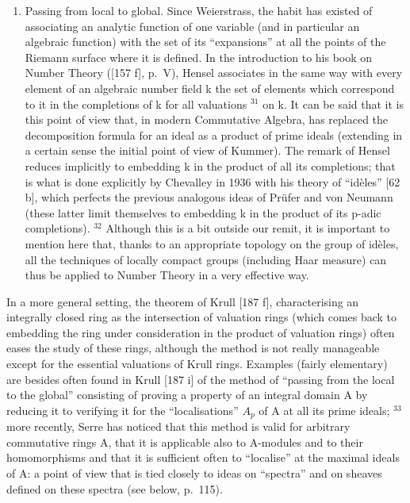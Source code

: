 \begin{enumerate}
\def\labelenumi{\Alph{enumi})}
\setcounter{enumi}{1}
\tightlist
\item
  Passing from local to global. Since Weierstrass, the habit has existed of associating an analytic function of one variable (and in particular an algebraic function) with the set of its ``expansions'' at all the points of the Riemann surface where it is defined. In the introduction to his book on Number Theory ({[}157 f{]}, p.~V), Hensel associates in the same way with every element of an algebraic number field k the set of elements which correspond to it in the completions of k for all valuations \(^{31}\) on k. It can be said that it is this point of view that, in modern Commutative Algebra, has replaced the decomposition formula for an ideal as a product of prime ideals (extending in a certain sense the initial point of view of Kummer). The remark of Hensel reduces implicitly to embedding k in the product of all its completions; that is what is done explicitly by Chevalley in 1936 with his theory of ``idèles'' {[}62 b{]}, which perfects the previous analogous ideas of Prüfer and von Neumann (these latter limit themselves to embedding k in the product of its p-adic completions). \(^{32}\) Although this is a bit outside our remit, it is important to mention here that, thanks to an appropriate topology on the group of idèles, all the techniques of locally compact groups (including Haar measure) can thus be applied to Number Theory in a very effective way.
\end{enumerate}

In a more general setting, the theorem of Krull {[}187 f{]}, characterising an integrally closed ring as the intersection of valuation rings (which comes back to embedding the ring under consideration in the product of valuation rings) often eases the study of these rings, although the method is not really manageable except for the essential valuations of Krull rings. Examples (fairly elementary) are besides often found in Krull {[}187 i{]} of the method of ``passing from the local to the global'' consisting of proving a property of an integral domain A by reducing it to verifying it for the ``localisations'' \(A_{p}\) of A at all its prime ideals; \(^{33}\) more recently, Serre has noticed that this method is valid for arbitrary commutative rings A, that it is applicable also to A-modules and to their homomorphisms and that it is sufficient often to ``localise'' at the maximal ideals of A: a point of view that is tied closely to ideas on ``spectra'' and on sheaves defined on these spectra (see below, p.~115).

